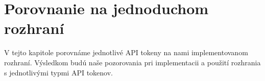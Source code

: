 \chapter{Porovnanie na jednoduchom rozhraní}

\label{kap:rozhranie} %

V tejto kapitole porovnáme jednotlivé API tokeny na nami implementovanom rozhraní. Výsledkom budú naše pozorovania pri implementacii a použití rozhrania s jednotlivými typmi API tokenov.